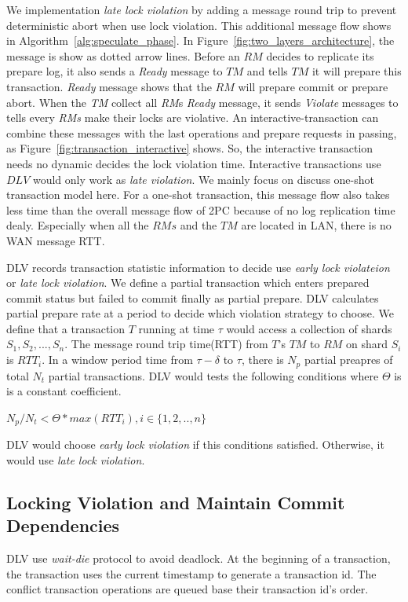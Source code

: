 \documentclass[conference]{IEEEtran}
\begin{document}
We implementation \emph{late lock violation} by adding a message round trip to prevent deterministic abort when use lock violation.
This additional message flow shows in Algorithm~\ref{alg:speculate_phase}.
In Figure~\ref{fig:two_layers_architecture}, the message is show as dotted arrow lines.
Before an ${RM}$ decides to replicate its prepare log, it also sends a \emph{Ready} message to ${TM}$ and tells ${TM}$ it will prepare this transaction.
\emph{Ready} message shows that the ${RM}$ will prepare commit or prepare abort.
When the \emph{TM} collect all \emph{RM}s \emph{Ready} message, it sends \emph{Violate} messages to tells every \emph{RMs} make their locks are violative.
An interactive-transaction can combine these messages with the last operations and prepare requests in passing, as Figure~\ref{fig:transaction_interactive} shows.
So, the interactive transaction needs no dynamic decides the lock violation time.
Interactive transactions use ${DLV}$ would only work as \emph{late violation}.
We mainly focus on discuss one-shot transaction model here.
For a one-shot transaction, this message flow also takes less time than the overall message flow of 2PC because of no log replication time dealy.
Especially when all the ${RMs}$ and the ${TM}$ are located in LAN, there is no WAN message RTT. 

DLV records transaction statistic information to decide use \emph{early lock violateion} or \emph{late lock violation}.
We define a partial transaction which enters prepared commit status but failed to commit finally as partial prepare.
DLV calculates partial prepare rate at a period to decide which violation strategy to choose.
We define that a transaction ${T}$ running at time ${\tau}$ would access a collection of shards
${S_1, S_2, ..., S_n}$. 
The message round trip time(RTT) from ${T}$'s ${TM}$ to ${RM}$ on shard ${S_i}$ is ${RTT_i}$.
In a window period time from ${\tau - \delta}$ to ${\tau}$, there is ${N_p}$ partial preapres of total ${N_t}$ partial transactions. 
DLV would tests the following conditions where ${\Theta}$ is is a constant coefficient. 

\begin{center}
  ${N_p / N_t < \Theta * max(RTT_i), i \in \{1,2, .., n\}}$
\end{center}

DLV would choose \emph{early lock violation} if this conditions satisfied. 
Otherwise, it would use \emph{late lock violation}.


\subsection {Locking Violation and Maintain Commit Dependencies}
DLV use \emph{wait-die} protocol to avoid deadlock.
At the beginning of a transaction, the transaction uses the current timestamp to generate a transaction id.
The conflict transaction operations are queued base their transaction id's order. 
\end{document}
